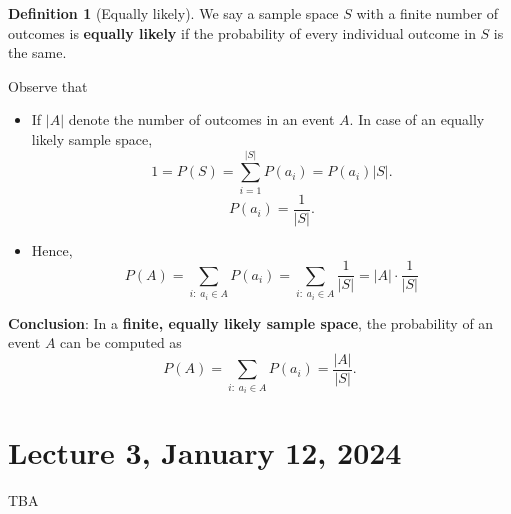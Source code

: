 \documentclass[
]{book}
\theoremstyle{definition}
\newtheorem{definition}{Definition}[chapter]
\theoremstyle{definition}
\theoremstyle{definition}
\theoremstyle{definition}
\theoremstyle{remark}
\begin{document}
\begin{definition}[Equally likely]
We say a sample space \(S\) with a finite number of outcomes is \textbf{equally likely} if the probability of every individual outcome in \(S\) is the same.
\end{definition}

Observe that

\begin{itemize}
\item
  If \(|A|\) denote the number of outcomes in an event \(A\). In case of an equally likely sample space,
  \[
  1=P(S)=\sum_{i=1}^{|S|}P(a_{i})= P(a_i)|S|.
  \]
  \[
  P(a_i)=\frac{1}{|S|}.
  \]
\item
  Hence,
  \[P(A) = \sum_{i:\;a_i \in A} P(a_i) = \sum_{i:\;a_i \in A} \frac{1}{|S|} =|A|\cdot  \frac{1}{|S|}\]
\end{itemize}

\textbf{Conclusion}: In a \textbf{finite, equally likely sample space}, the probability of an event \(A\) can be computed as
\[
P(A) = \sum_{i:\;a_i \in A} P(a_i) = \frac{|A|}{|S|}.
\]

\hypertarget{lecture-3-january-12-2024}{%
\chapter{Lecture 3, January 12, 2024}\label{lecture-3-january-12-2024}}

TBA

  
\end{document}
